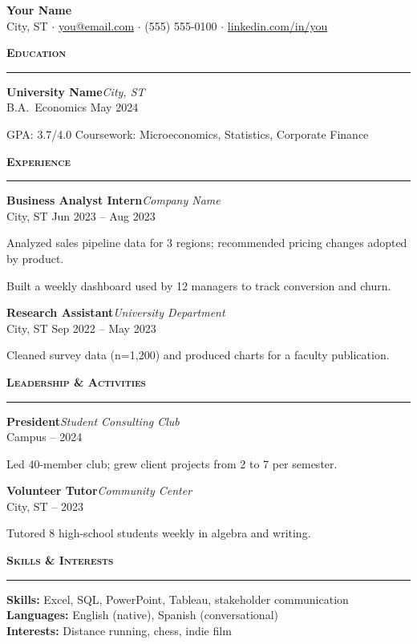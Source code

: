 \documentclass[11pt,letterpaper]{article}
\newcommand{\resumesection}[1]{%
  \par\vspace{0.85em}%
  {\normalsize\bfseries\scshape\color{accent}#1}\par
  \vspace{-0.4em}%
  \textcolor{accent}{\rule{\textwidth}{0.5pt}}\par
  \vspace{0.4em}%
}
\newcommand{\role}[3]{%
  \noindent\textbf{#1}\hfill\textit{#2}\\
  \textcolor{muted}{\small #3}\par\vspace{0.2em}
}
\newenvironment{resumeitemize}{%
  \begin{list}{\textbullet}{%
    \setlength{\leftmargin}{1.15em}%
    \setlength{\itemsep}{0.2em}%
    \setlength{\parsep}{0pt}%
    \setlength{\topsep}{0.15em}%
    \setlength{\partopsep}{0pt}%
  }%
}{\end{list}}
\newcommand{\entrygap}{\vspace{0.55em}}
\begin{document}
\begin{center}
  {\LARGE\bfseries Your Name}\\[0.4em]
  {\small
    City, ST
    $\cdot$ \href{mailto:you@email.com}{you@email.com}
    $\cdot$ (555) 555-0100
    $\cdot$ \href{https://linkedin.com/in/you}{linkedin.com/in/you}
  }
\end{center}

\resumesection{Education}
\role{University Name}{City, ST}{B.A.\ Economics \quad May 2024}
\begin{resumeitemize}
  \item GPA: 3.7/4.0 \quad Coursework: Microeconomics, Statistics, Corporate Finance
\end{resumeitemize}

\resumesection{Experience}
\role{Business Analyst Intern}{Company Name}{City, ST \quad Jun 2023 -- Aug 2023}
\begin{resumeitemize}
  \item Analyzed sales pipeline data for 3 regions; recommended pricing changes adopted by product.
  \item Built a weekly dashboard used by 12 managers to track conversion and churn.
\end{resumeitemize}
\entrygap
\role{Research Assistant}{University Department}{City, ST \quad Sep 2022 -- May 2023}
\begin{resumeitemize}
  \item Cleaned survey data (n=1{,}200) and produced charts for a faculty publication.
\end{resumeitemize}

\resumesection{Leadership \& Activities}
\role{President}{Student Consulting Club}{Campus  -- 2024}
\begin{resumeitemize}
  \item Led 40-member club; grew client projects from 2 to 7 per semester.
\end{resumeitemize}
\entrygap
\role{Volunteer Tutor}{Community Center}{City, ST  -- 2023}
\begin{resumeitemize}
  \item Tutored 8 high-school students weekly in algebra and writing.
\end{resumeitemize}

\resumesection{Skills \& Interests}
\noindent\textbf{Skills:} Excel, SQL, PowerPoint, Tableau, stakeholder communication\\
\textbf{Languages:} English (native), Spanish (conversational)\\
\textbf{Interests:} Distance running, chess, indie film
\end{document}
